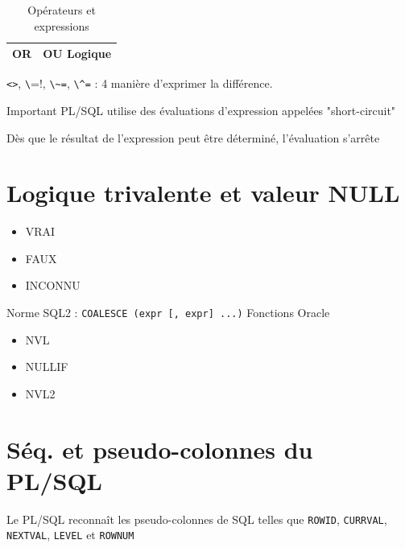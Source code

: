 \documentclass[10pt]{beamer}
\begin{document}
\begin{frame}{\secname}
\begin{table}[]
\begin{tabular}{|l|l|}
            OR                                                                                                                                                                                                & OU Logique                           \\ \hline
        \end{tabular}
        \caption{Opérateurs et expressions}
    \end{table}
    \lstinline[language=plsql]!<>!, \lstinline[language=plsql]!\!=!, \lstinline[language=plsql]!\~=!, \lstinline[language=plsql]!\^=!  :  4 manière d'exprimer la différence.
\end{frame}

\begin{frame}{\secname}
    \begin{alertblock}{Important}
        PL/SQL utilise des évaluations d'expression appelées "short-circuit"
    \end{alertblock}
    Dès que le résultat de l'expression peut être déterminé, l'évaluation s'arrête
    
\end{frame}

\section{Logique trivalente et valeur NULL}
\begin{frame}{\secname}
    \begin{itemize}
        \item VRAI
        \item FAUX
        \item INCONNU
    \end{itemize}
\end{frame}

\begin{frame}{\secname}
    Norme SQL2 : \lstinline[language=bnf]!COALESCE (expr [, expr] ...)!
    Fonctions Oracle
    \begin{itemize}
        \item NVL
        \item NULLIF
        \item NVL2
    \end{itemize}
\end{frame}
\section{Séq. et pseudo-colonnes du PL/SQL}
\begin{frame}{\secname}
    Le PL/SQL reconnaît les pseudo-colonnes de SQL telles que \lstinline[language=plsql]!ROWID!, \lstinline[language=plsql]!CURRVAL!, \lstinline[language=plsql]!NEXTVAL!, \lstinline[language=plsql]!LEVEL! et \lstinline[language=plsql]!ROWNUM!
    
\end{frame}
\end{document}
